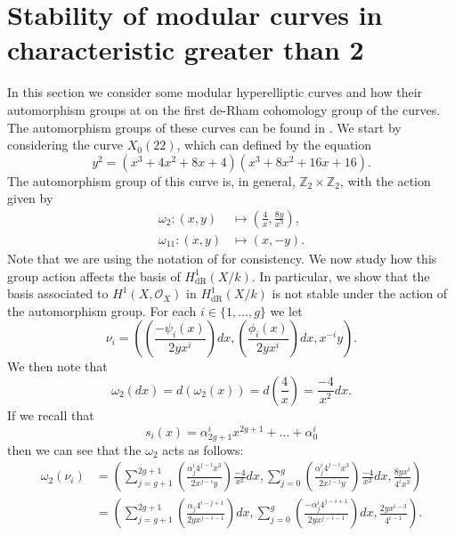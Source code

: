 \documentclass[draft, 11pt]{article} %
\theoremstyle{plain}
\theoremstyle{remark}
\newcommand{\hone}{H^1(X,\mathcal{O}_X)}
\newcommand{\derhamhone}{H_{\text {dR}}^1(X/k)}
\begin{document}
\section{Stability of modular curves in characteristic greater than 2}
In this section we consider some modular hyperelliptic curves and how their automorphism groups at on the first de-Rham cohomology group of the curves.
The automorphism groups of these curves can be found in \cite{automorphismshyperellipticmodular}.
We start by considering the curve $X_0(22)$, which can defined by the equation
\begin{equation*}
y^2 = (x^3+ 4x^2 + 8x + 4)(x^3 + 8x^2 + 16x + 16).
\end{equation*}
The automorphism group of this curve is, in general, $\mathbb Z_2 \times \mathbb Z_2$, with the action given by 
\begin{align}
\omega_2\colon (x,y) & \mapsto \left( \frac{4}{x} , \frac{8y}{x^3} \right), \\
\omega_{11}\colon (x,y) & \mapsto (x, -y ).
\end{align}
Note that we are using the notation of \cite{automorphismshyperellipticmodular} for consistency.
We now study how this group action affects the basis of $\derhamhone$.
In particular, we show that the basis associated to $\hone$ in $\derhamhone$ is not stable under the action of the automorphism group.
For each $i \in \{ 1, \ldots , g\}$ we let 
\begin{equation*}
\nu_i = \left( \left( \frac{-\psi_i(x)}{2yx^i} \right) dx , \left( \frac{\phi_i(x)}{2yx^i} \right) dx, x^{-i}y \right).
\end{equation*}
We then note that 
\[
\omega_2(dx) = d( \omega_2(x)) = d\left( \frac{4}{x} \right) = \frac{-4}{x^2}dx.
\]
If we recall that 
\[
s_i(x) = \alpha_{2g+1}^ix^{2g+1} + \ldots + \alpha_0^i
\]
then we can see that the $\omega_2$ acts as follows:
\begin{equation}\label{omega11action}
\begin{split}
\omega_2 (\nu_i) & = \left( \sum_{j = g+1}^{2g+1} \left( \frac{\alpha_j^i 4^{j-i}x^3}{2x^{j-i}y} \right) \frac{-4}{x^2} dx, \sum_{j = 0}^{g} \left(\frac{\alpha_j^i 4^{j-i} x^3}{2x^{j-i}y} \right) \frac{-4}{x^2}dx , \frac{8yx^i}{4^i x^3} \right) \\
& = \left( \sum_{j=g+1}^{2g+1} \left( \frac{\alpha_j4^{i-j+1}}{2yx^{j-i-1}} \right)dx, \sum_{j = 0}^{g} \left( \frac{-\alpha_j^i 4^{j-i+1}}{2yx^{j-i-1}} \right) dx, \frac{2yx^{i-3}}{4^{i-1}} \right).
\end{split}
\end{equation}
\end{document}
